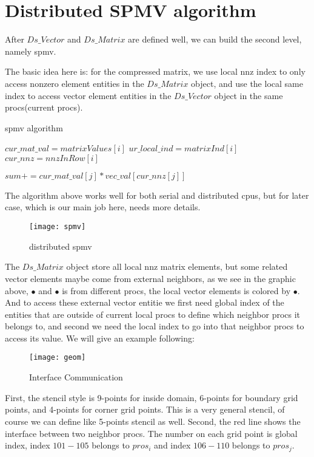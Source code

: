 \documentclass[11pt]{article}
\begin{document}
\section {Distributed SPMV algorithm}

	After $Ds\_Vector$ and $Ds\_Matrix$ are defined well, we can build the second level, namely spmv.	

The basic idea here is: for the compressed matrix, we use local nnz index to only access nonzero element entities in the $Ds\_Matrix$ object, and use the local same index to access vector element entities in the $Ds\_Vector$ object in the same procs(current procs). 

\begin{algorithm}
\caption{spmv algorithm}
\begin{algorithmic}[1]
	\State $cur\_mat\_val = matrixValues[i]$
	\State $ur\_local\_ind = matrixInd[i] $
	\State $cur\_nnz = nnzInRow[i] $

		\State $ sum += cur\_mat\_val[j] * vec\_val[cur\_nnz[j]] $
	\EndFor
\EndFor
\end{algorithmic}
\end{algorithm}
	

The algorithm above works well for both serial and distributed cpus, but for later case, which is our main job here, needs more details. 
	
\begin{figure}[h]
	\centering
	\texttt{[image: spmv]}
	\caption{distributed spmv}
\end{figure}

The $Ds\_Matrix$ object store all local nnz matrix elements, but some related vector elements maybe come from external neighbors, as we see in the graphic above, {\color{red} $\bullet$} and {\color{green} $\bullet$} is from different procs, the local vector elements is colored by {\color{blue} $\bullet$}. And to access these external vector entitie we first need global index of the entities that are outside of current local procs to define which neighbor procs it belongs to, and second we need the local index to go into that neighbor procs to access its value. We will give an example following:

\begin{figure}[h]
	\centering
	\texttt{[image: geom]}
	\caption{Interface Communication}
\end{figure}
	
First, the stencil style is 9-points for inside domain, 6-points for boundary grid points, and 4-points for corner grid points. This is a very general stencil, of course we can define like 5-points stencil as well. Second, the red line shows the interface between two neighbor procs. The number on each grid point is global index, index $101 - 105$ belongs to $pros_i$ and index $106 - 110$ belongs to $pros_j$. 
	 	
\end{document}
